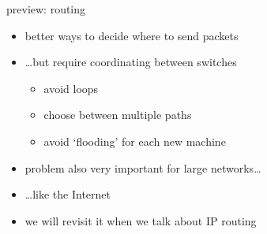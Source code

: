 \begin{frame}{preview: routing}
    \begin{itemize}
    \item better ways to decide where to send packets
    \item \ldots but require coordinating between switches
        \begin{itemize}
        \item avoid loops
        \item choose between multiple paths
        \item avoid `flooding' for each new machine
        \end{itemize}
    \vspace{.5cm}
    \item problem also very important for large networks\ldots
    \item \ldots like the Internet
    \item we will revisit it when we talk about IP routing
    \end{itemize}
\end{frame}
